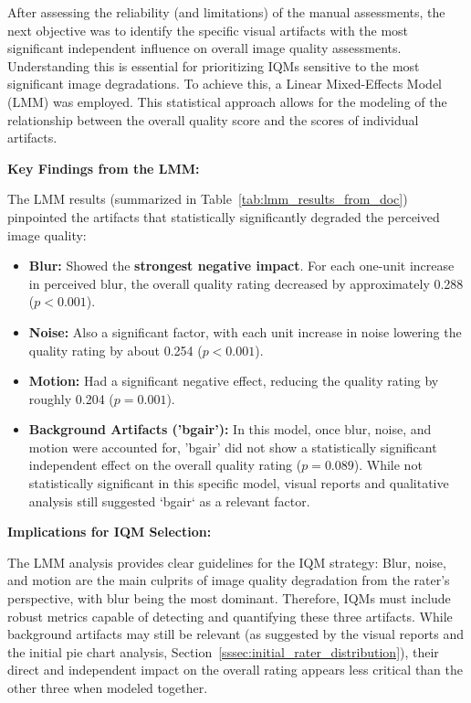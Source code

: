 After assessing the reliability (and limitations) of the manual assessments, the next objective was to identify the specific visual artifacts with the most significant independent influence on overall image quality assessments. Understanding this is essential for prioritizing IQMs sensitive to the most significant image degradations. To achieve this, a Linear Mixed-Effects Model (LMM) was employed. This statistical approach allows for the modeling of the relationship between the overall quality score and the scores of individual artifacts.

\textbf{Key Findings from the LMM:}

The LMM results (summarized in Table~\ref{tab:lmm_results_from_doc}) pinpointed the artifacts that statistically significantly degraded the perceived image quality:

\begin{itemize}
    \item \textbf{Blur:} Showed the \textbf{strongest negative impact}. For each one-unit increase in perceived blur, the overall quality rating decreased by approximately 0.288 ($p < 0.001$).
    \item \textbf{Noise:} Also a significant factor, with each unit increase in noise lowering the quality rating by about 0.254 ($p < 0.001$).
    \item \textbf{Motion:} Had a significant negative effect, reducing the quality rating by roughly 0.204 ($p = 0.001$).
    \item \textbf{Background Artifacts ('bgair'):} In this model, once blur, noise, and motion were accounted for, 'bgair' did not show a statistically significant independent effect on the overall quality rating ($p = 0.089$). While not statistically significant in this specific model, visual reports and qualitative analysis still suggested `bgair` as a relevant factor.
\end{itemize}

\textbf{Implications for IQM Selection:}

The LMM analysis provides clear guidelines for the IQM strategy: Blur, noise, and motion are the main culprits of image quality degradation from the rater's perspective, with blur being the most dominant. Therefore, IQMs must include robust metrics capable of detecting and quantifying these three artifacts. While background artifacts may still be relevant (as suggested by the visual reports and the initial pie chart analysis, Section~\ref{sssec:initial_rater_distribution}), their direct and independent impact on the overall rating appears less critical than the other three when modeled together.

